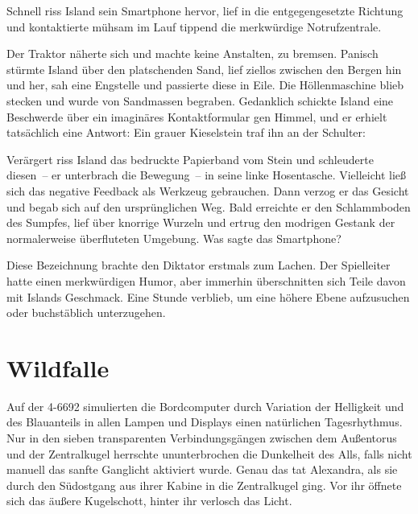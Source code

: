 Schnell riss Island sein Smartphone hervor, lief in die entgegengesetzte Richtung und kontaktierte mühsam im Lauf tippend die merkwürdige Notrufzentrale.


Der Traktor näherte sich und machte keine Anstalten, zu bremsen. Panisch stürmte Island über den platschenden Sand, lief ziellos zwischen den Bergen hin und her, sah eine Engstelle und passierte diese in Eile. Die Höllenmaschine blieb stecken und wurde von Sandmassen begraben. Gedanklich schickte Island eine Beschwerde über ein imaginäres Kontaktformular gen Himmel, und er erhielt tatsächlich eine Antwort: Ein grauer Kieselstein traf ihn an der Schulter: 

Verärgert riss Island das bedruckte Papierband vom Stein und schleuderte diesen~– er unterbrach die Bewegung~– in seine linke Hosentasche. Vielleicht ließ sich das negative Feedback als Werkzeug gebrauchen. Dann verzog er das Gesicht und begab sich auf den ursprünglichen Weg. Bald erreichte er den Schlammboden des Sumpfes, lief über knorrige Wurzeln und ertrug den modrigen Gestank der normalerweise überfluteten Umgebung. Was sagte das Smartphone?


Diese Bezeichnung brachte den Diktator erstmals zum Lachen. Der Spielleiter hatte einen merkwürdigen Humor, aber immerhin überschnitten sich Teile davon mit Islands Geschmack. Eine Stunde verblieb, um eine höhere Ebene aufzusuchen oder buchstäblich unterzugehen.


\chapter{Wildfalle}

Auf der 4-6692 simulierten die Bordcomputer durch Variation der Helligkeit und des Blauanteils in allen Lampen und Displays einen natürlichen Tagesrhythmus. Nur in den sieben transparenten Verbindungsgängen zwischen dem Außentorus und der Zentralkugel herrschte ununterbrochen die Dunkelheit des Alls, falls nicht manuell das sanfte Ganglicht aktiviert wurde. Genau das tat Alexandra, als sie durch den Südostgang aus ihrer Kabine in die Zentralkugel ging. Vor ihr öffnete sich das äußere Kugelschott, hinter ihr verlosch das Licht.

